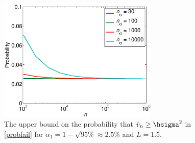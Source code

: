 \documentclass[graybox]{svmult}
\newcommand{\hv}{\hat{v}}
\begin{document}
\begin{figure}
\centering
\includegraphics[width=3in]{probfailfig.eps}
\caption{The upper bound on the probability that $\hv_n \ge \hsigma^2$ in \eqref{probfail} for $\alpha_1 = 1 - \sqrt{95\%} \approx 2.5\%$ and $L=1.5$. \label{probfailfig}}
\end{figure}
\end{document}
